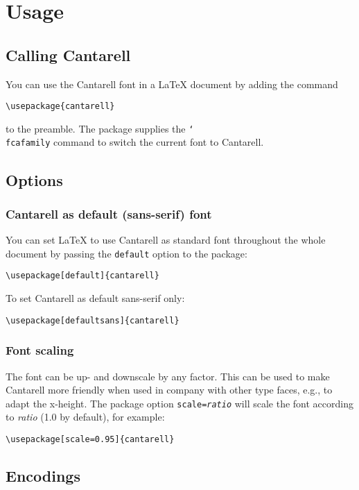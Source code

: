 \documentclass{article}
\newcommand{\code}{\texttt}
\newcommand{\parameter}[1]{\textnormal{\textit{#1}}}
\begin{document}
\section{Usage}

\subsection{Calling Cantarell}

You can use the Cantarell font in a \LaTeX{} document by adding the command
\begin{verbatim}
\usepackage{cantarell}
\end{verbatim}
to the preamble. The package supplies the \code{\char`\\fcafamily} command to
switch the current font to Cantarell.

\subsection{Options}

\subsubsection{Cantarell as default (sans-serif) font}

You can set \LaTeX{} to use Cantarell as standard font throughout the whole
document by passing the \code{default} option to the package:
\begin{verbatim}
\usepackage[default]{cantarell}
\end{verbatim}
To set Cantarell as default sans-serif only:
\begin{verbatim}
\usepackage[defaultsans]{cantarell}
\end{verbatim}

\subsubsection{Font scaling}

The font can be up- and downscale by any factor. This can be used to make
Cantarell more friendly when used in company with other type faces, e.g., to
adapt the x-height. The package option \code{scale=\parameter{ratio}} will scale
the font according to \parameter{ratio} (1.0 by default), for example:
\begin{verbatim}
\usepackage[scale=0.95]{cantarell}
\end{verbatim}

\subsection{Encodings}
\end{document}
